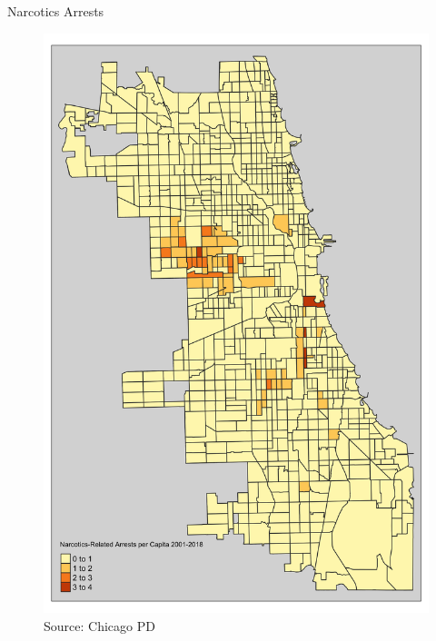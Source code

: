 \documentclass[10pt,ignorenonframetext,]{beamer}
\begin{document}
\begin{frame}{Narcotics Arrests}
\protect\hypertarget{narcotics-arrests-1}{}

\begin{figure}
\centering
\includegraphics{../chicago/figs/chi_tna_map.png}
\caption{Source: Chicago PD}
\end{figure}

\end{frame}
\end{document}
